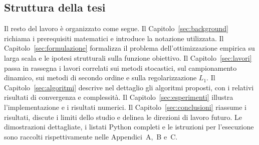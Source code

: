 \subsection{Struttura della tesi}

Il resto del lavoro è organizzato come segue. Il Capitolo~\ref{sec:background}
richiama i prerequisiti matematici e introduce la notazione utilizzata.
Il Capitolo~\ref{sec:formulazione} formalizza il problema dell'ottimizzazione
empirica su larga scala e le ipotesi strutturali sulla funzione obiettivo.
Il Capitolo~\ref{sec:lavori} passa in rassegna i lavori correlati sui metodi
stocastici, sul campionamento dinamico, sui metodi di secondo ordine e sulla
regolarizzazione $L_1$. Il Capitolo~\ref{sec:algoritmi} descrive nel dettaglio
gli algoritmi proposti, con i relativi risultati di convergenza e complessità.
Il Capitolo~\ref{sec:esperimenti} illustra l'implementazione e i risultati
numerici. Il Capitolo~\ref{sec:conclusioni} riassume i risultati, discute i
limiti dello studio e delinea le direzioni di lavoro futuro. Le dimostrazioni
dettagliate, i listati Python completi e le istruzioni per l'esecuzione sono
raccolti rispettivamente nelle Appendici~A,~B e~C.
